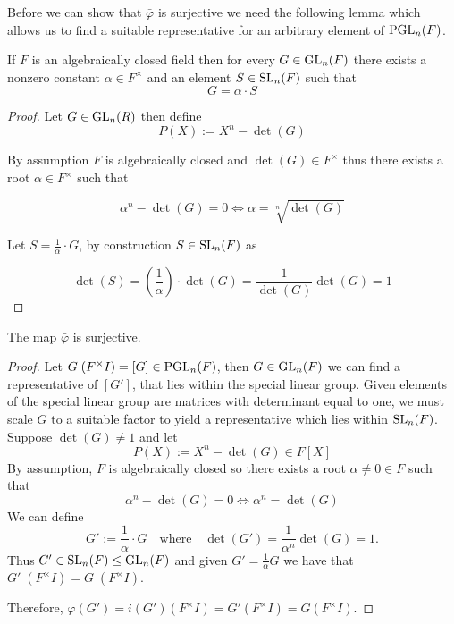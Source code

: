 Before we can show that $\bar{\varphi}$ is surjective we need the following lemma which allows us to find a suitable representative for an arbitrary element of $\operatorname{PGL}_n(F)$.

\begin{lemma}
\label{exists_SL_eq_scaled_GL_of_IsAlgClosed}
\leanok
If $F$ is an algebraically closed field then for every $G \in \operatorname{GL}_n(F)$ there exists a nonzero constant $\alpha \in F^\times$ and an element $S \in \operatorname{SL}_n(F)$ such that 
\begin{equation*}
    G = \alpha \cdot S
\end{equation*}
\end{lemma}

\begin{proof}
\leanok
Let $G \in \operatorname{GL}_n(R)$ then define
\begin{equation*}
    P(X) := X^n - \det(G)
\end{equation*}

By assumption $F$ is algebraically closed and $\det(G) \in F^\times$ thus there exists a root $\alpha \in F^\times$ such that 

\begin{equation*}
    \alpha^n - \det(G) = 0 \iff \alpha = \sqrt[n]{\det(G)} 
\end{equation*}

Let $S = \frac{1}{\alpha} \cdot G$, by construction $S \in \operatorname{SL}_n(F)$ as 

\begin{equation*}
    \det(S) = \left(\frac{1}{\alpha}\right) \cdot \det(G) = \frac{1}{\det(G)} \det(G) = 1
\end{equation*}
\end{proof}

\begin{lemma}
\label{Surjective_PSL_monoidHom_PGL}
\leanok
    The map $\bar{\varphi}$ is surjective.
\end{lemma}

\begin{proof}
\leanok
    Let $G \; (F^\times I) = [G] \in \operatorname{PGL}_n(F)$, then $G \in \operatorname{GL}_n(F)$ we can find a representative of $[G']$, that lies within the special linear group.
    Given elements of the special linear group are matrices with determinant equal to one, we must scale $G$ to a suitable factor to yield a representative which lies within $\operatorname{SL}_n(F)$. Suppose $\det(G) \ne 1$ and let
    \[
    P(X) := X^n - \det(G) \in F[X]
    \]
    By assumption, $F$ is algebraically closed so there exists a root $\alpha \ne 0\in F$ such that 
    \[
    \alpha^n - \det(G) = 0 \iff \alpha^n = \det(G)
    \]
    We can define
    \[
    G' := \frac{1}{\alpha} \cdot G \quad \text{where} \quad \det(G') = \frac{1}{\alpha^n} \det(G) = 1.
    \]
    Thus $G' \in \operatorname{SL}_n(F) \leq \operatorname{GL}_n(F)$ and given $G' = \frac{1}{\alpha} G$ we have that $G'  \; (F^\times I) = G \; (F^\times I)$.
    
    Therefore, $\varphi(G') = i(G') (F^\times I) = G' (F^\times I) = G (F^\times I)$.
\end{proof}

